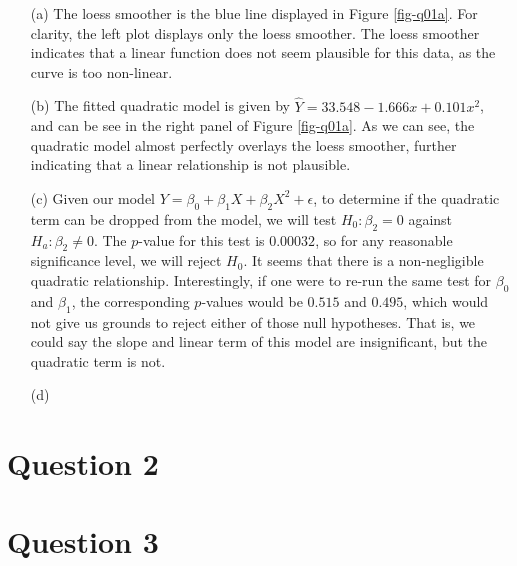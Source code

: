 \documentclass[10pt]{article}
\begin{document}
\begin{itemize}
    \item[(a)] The loess smoother is the blue line displayed in Figure \ref{fig-q01a}. For clarity, the left plot displays only the loess smoother. The loess 
    smoother indicates that a linear function does not seem plausible for this data, as the curve is too non-linear. 
    \item[(b)] The fitted quadratic model is given by \(\hat{Y} = 33.548 - 1.666 x + 0.101 x^2\), and can be see in the right panel of Figure \ref{fig-q01a}. 
    As we can see, the quadratic model almost perfectly overlays the loess smoother, further indicating that a linear relationship is not plausible. 
    \item[(c)] Given our model \(Y = \beta_0 + \beta_1 X + \beta_2 X^2 + \epsilon\), to determine if the quadratic term can be dropped from the model, we will
    test \(H_0 : \beta_2 = 0\) against \(H_a : \beta_2 \neq 0\). The \(p\)-value for this test is \(0.00032\), so for any reasonable significance level, we
    will reject \(H_0\). It seems that there is a non-negligible quadratic relationship. Interestingly, if one were to re-run the same test for \(\beta_0\) and 
    \(\beta_1\), the corresponding \(p\)-values would be \(0.515\) and \(0.495\), which would not give us grounds to reject either of those null hypotheses.
    That is, we could say the slope and linear term of this model are insignificant, but the quadratic term is not. 
    \item[(d)] 
\end{itemize}


\section{Question 2} \noindent



\section{Question 3} \noindent



\end{document}
